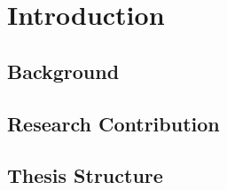 \chapter{Introduction}
\label{introduction}

\section{Background}
\label{introduction:background} 

\section{Research Contribution}
\label{introduction:research-contribution}

\section{Thesis Structure}
\label{introduction:thesis-structure} 



